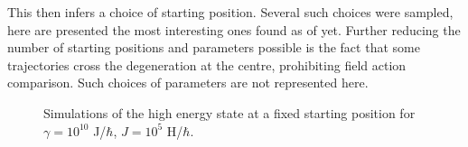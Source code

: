 \documentclass[main.tex]{subfiles}
\begin{document}
This then infers a choice of starting position. Several such choices were sampled, here are
presented the most interesting ones found as of yet. Further reducing the number of
starting positions and parameters possible is the fact that some trajectories cross the
degeneration at the centre, prohibiting field action comparison. Such choices of parameters
are not represented here. 

\begin{figure}[h]
    \centering
    \qquad
    \caption{\centering Simulations of the high energy state at a fixed starting position for \(\gamma
    = 10^{10}\) J/\(\hbar{}\), \(J= 10^{5}\) H/\(\hbar{}\).}%
    \label{fig:n2m-25}
\end{figure}
\end{document}
